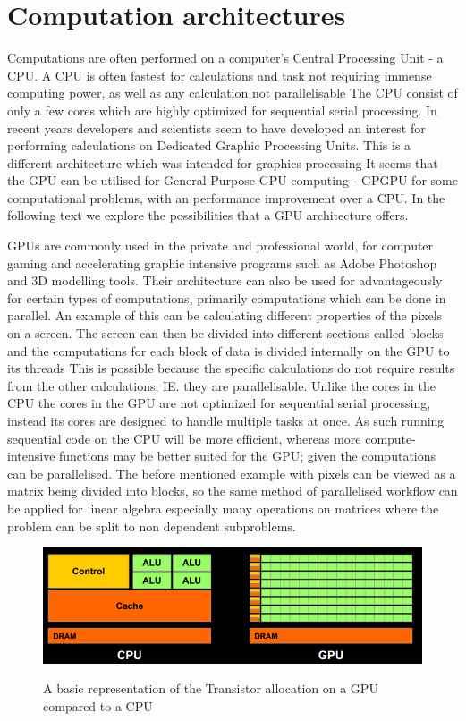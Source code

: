 \section{Computation architectures}
\label{sec:comparch}
Computations are often performed on a computer's Central Processing Unit - a CPU.
A CPU is often fastest for calculations and task not requiring immense computing power, as well as any calculation not parallelisable
The CPU consist of only a few cores which are highly optimized for sequential serial processing.\citep{whatisgpu}
In recent years developers and scientists seem to have developed an interest for performing calculations on Dedicated Graphic Processing Units.\citep{gpurise}
This is a different architecture which was intended for graphics processing
It seems that the GPU can be utilised for General Purpose GPU computing - GPGPU for some computational problems, with an performance improvement over a CPU.
In the following text we explore the possibilities that a GPU architecture offers.

GPUs are commonly used in the private and professional world, for computer gaming and accelerating graphic intensive programs such as Adobe Photoshop and 3D modelling tools. \citep{NVIDIAADOBE,STEAMHW}
Their architecture can also be used for advantageously for certain types of computations, primarily computations which can be done in parallel. 
An example of this can be calculating different properties of the pixels on a screen. 
The screen can then be divided into different sections called blocks and the computations for each block of data is divided internally on the GPU to its threads
This is possible because the specific calculations do not require results from the other calculations, IE. they are parallelisable.
Unlike the cores in the CPU the cores in the GPU are not optimized for sequential serial processing, instead its cores are designed to handle multiple tasks at once. 
As such running sequential code on the CPU will be more efficient, whereas more compute-intensive functions may be better suited for the GPU; given the computations can be parallelised.\citep{NvidiaGPGPU}
The before mentioned example with pixels can be viewed as a matrix being divided into blocks, so the same method of parallelised workflow can be applied for linear algebra especially many operations on matrices where the problem can be split to non dependent subproblems.

\begin{figure}[h!]
\centering
 \includegraphics[width=1\textwidth]{figures/GPUCPUimage.png} %
\caption{A basic representation of the Transistor allocation on a GPU compared to a CPU}\label{image:GPUCPUimage}\citep{NvidiaCUDASeminar}
\vspace{-15pt}
\end{figure}

